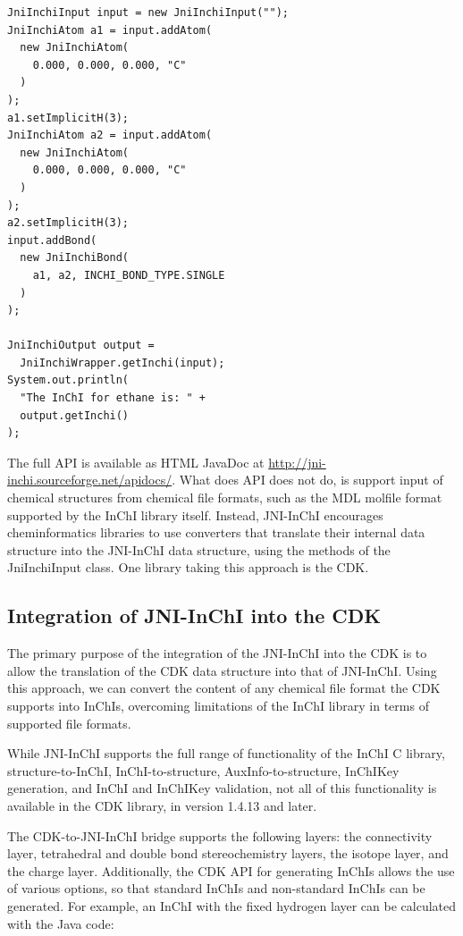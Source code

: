 \documentclass[10pt]{bmc_article}
\newenvironment{bmcformat}{\fussy\setboolean{publ}{true}}{\fussy}
\begin{document}
\begin{bmcformat}
\begin{verbatim}
JniInchiInput input = new JniInchiInput("");
JniInchiAtom a1 = input.addAtom(
  new JniInchiAtom(
    0.000, 0.000, 0.000, "C"
  )
);
a1.setImplicitH(3);
JniInchiAtom a2 = input.addAtom(
  new JniInchiAtom(
    0.000, 0.000, 0.000, "C"
  )
);
a2.setImplicitH(3);
input.addBond(
  new JniInchiBond(
    a1, a2, INCHI_BOND_TYPE.SINGLE
  )
);
  
JniInchiOutput output =
  JniInchiWrapper.getInchi(input);
System.out.println(
  "The InChI for ethane is: " +
  output.getInchi()
);
\end{verbatim}

The full API is available as HTML JavaDoc at \url{http://jni-inchi.sourceforge.net/apidocs/}. What does API does not do, is support input of chemical
structures from chemical file formats, such as the MDL molfile format supported by the InChI library itself.
Instead, JNI-InChI encourages cheminformatics libraries to use converters that translate their internal
data structure into the JNI-InChI data structure, using the methods of the JniInchiInput class.
One library taking this approach is the CDK.

\subsection*{Integration of JNI-InChI into the CDK}

The primary purpose of the integration of the JNI-InChI into the CDK is to allow the translation of the
CDK data structure into that of JNI-InChI. Using this approach, we can convert the content of any chemical
file format the CDK supports into InChIs, overcoming limitations of the InChI library in terms of supported
file formats.

While JNI-InChI supports the full range of functionality of the InChI C library, structure-to-InChI, InChI-to-structure,
AuxInfo-to-structure, InChIKey generation, and InChI and InChIKey validation, not all of this functionality is available in the
CDK library, in version 1.4.13 and later.

The CDK-to-JNI-InChI bridge supports the following layers: the connectivity layer, tetrahedral and double bond stereochemistry layers, the isotope layer, and the charge layer. Additionally, the CDK API for generating InChIs allows the
use of various options, so that standard InChIs and non-standard InChIs can be generated. For example,
an InChI with the fixed hydrogen layer can be calculated with the Java code:


\end{bmcformat}
\end{document}
